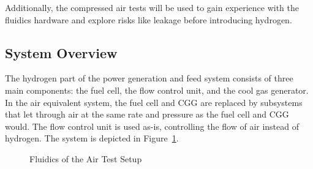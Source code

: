 Additionally, the compressed air tests will be used to gain experience with the fluidics hardware and explore risks like leakage before introducing hydrogen.





\subsection{System Overview}
The hydrogen part of the power generation and feed system consists of three main components: the fuel cell, the flow control unit, and the cool gas generator. In the air equivalent system, the fuel cell and CGG are replaced by subsystems that let through air at the same rate and pressure as the fuel cell and CGG would. The flow control unit is used as-is, controlling the flow of air instead of hydrogen. The system is depicted in Figure~\ref{fig:air test}.

\begin{figure}[htp]
    \centering
    \caption{Fluidics of the Air Test Setup}%
    \label{fig:air test}%
\end{figure}

